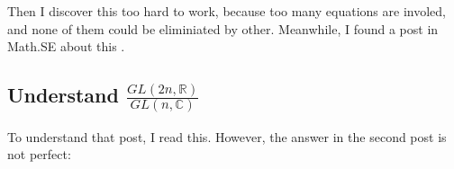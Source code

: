 \documentclass{article}
\numberwithin{equation}{subsection} %
\theoremstyle{definition}
\begin{document}
Then I discover this too hard to work, because too many equations are
involed, and none of them could be eliminiated by other. Meanwhile, I
found a post in Math.SE about this \cite{math.se_1}.

    \subsection{Understand \texorpdfstring{ 
                    $\frac{GL(2n,\mathbb{R})}
                        {GL(n,\mathbb{C})}$
                            }{}
                }
    \label{sec:Understand_GL(2n,R)/GL(n,C)}

    To understand that post, I read this\cite{math.se_2}. However, the answer
    in the second post is not perfect:
\end{document}
